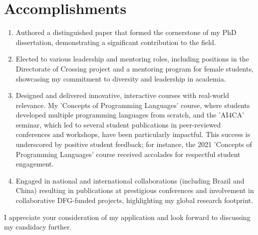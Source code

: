 \documentclass[11.8pt,a4paper,sans]{moderncv}
\begin{document}
\section*{Accomplishments}
\begin{enumerate}[label=A\arabic*]
\item Authored a distinguished paper that formed the cornerstone of my PhD dissertation, demonstrating a significant contribution to the field.
\item Elected to various leadership and mentoring roles, including positions in the Directorate of Crossing project and a mentoring program for female students, showcasing my commitment to diversity and leadership in academia.
\item Designed and delivered innovative, interactive courses with real-world relevance. My 'Concepts of Programming Languages' course, where students developed multiple programming languages from scratch, and the 'AI4CA' seminar, which led to several student publications in peer-reviewed conferences and workshops, have been particularly impactful. This success is underscored by positive student feedback; for instance, the 2021 'Concepts of Programming Languages' course received accolades for respectful student engagement.
\item Engaged in national and international collaborations (including Brazil and China) resulting in publications at prestigious conferences and involvement in collaborative DFG-funded projects, highlighting my global research footprint.
\end{enumerate}


 I appreciate your consideration of my application and look forward to discussing my candidacy further.

 \makeletterclosing
\end{document}
